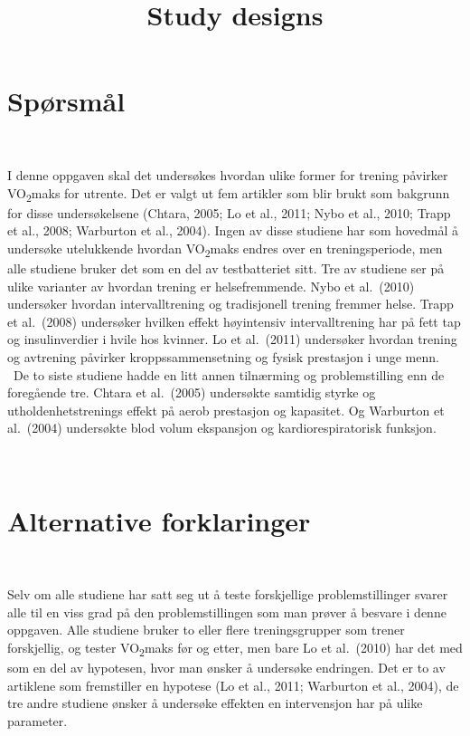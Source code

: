 \documentclass[
]{article}
\title{Study designs}
\author{}
\date{\vspace{-2.5em}}
\begin{document}
\maketitle

\hypertarget{spuxf8rsmuxe5l}{%
\section{Spørsmål}\label{spuxf8rsmuxe5l}}

~

I denne oppgaven skal det undersøkes hvordan ulike former for trening
påvirker VO\textsubscript{2}maks for utrente. Det er valgt ut fem
artikler som blir brukt som bakgrunn for disse undersøkelsene (Chtara,
2005; Lo et al., 2011; Nybo et al., 2010; Trapp et al., 2008; Warburton
et al., 2004). Ingen av disse studiene har som hovedmål å undersøke
utelukkende hvordan VO\textsubscript{2}maks endres over en
treningsperiode, men alle studiene bruker det som en del av
testbatteriet sitt. Tre av studiene ser på ulike varianter av hvordan
trening er helsefremmende. Nybo et al.~(2010) undersøker hvordan
intervalltrening og tradisjonell trening fremmer helse. Trapp et
al.~(2008) undersøker hvilken effekt høyintensiv intervalltrening har på
fett tap og insulinverdier i hvile hos kvinner. Lo et al.~(2011)
undersøker hvordan trening og avtrening påvirker kroppssammensetning og
fysisk prestasjon i unge menn. ~De to siste studiene hadde en litt annen
tilnærming og problemstilling enn de foregående tre. Chtara et
al.~(2005) undersøkte samtidig styrke og utholdenhetstrenings effekt på
aerob prestasjon og kapasitet. Og Warburton et al.~(2004) undersøkte
blod volum ekspansjon og kardiorespiratorisk funksjon.

~

\hypertarget{alternative-forklaringer}{%
\section{Alternative forklaringer}\label{alternative-forklaringer}}

~

Selv om alle studiene har satt seg ut å teste forskjellige
problemstillinger svarer alle til en viss grad på den problemstillingen
som man prøver å besvare i denne oppgaven. Alle studiene bruker to eller
flere treningsgrupper som trener forskjellig, og tester
VO\textsubscript{2}maks før og etter, men bare Lo et al.~(2010) har det
med som en del av hypotesen, hvor man ønsker å undersøke endringen. Det
er to av artiklene som fremstiller en hypotese (Lo et al., 2011;
Warburton et al., 2004), de tre andre studiene ønsker å undersøke
effekten en intervensjon har på ulike parameter.
\end{document}
